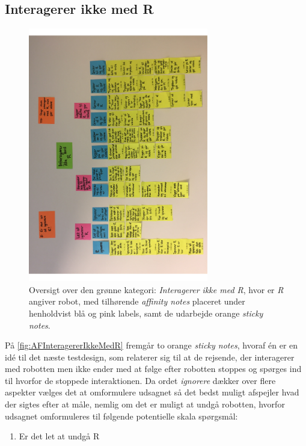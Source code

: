 \subsection{Interagerer ikke med R}
\label{ParametreInteragererIkkeMedR}
%
\begin{figure}[H]
\centering
\includegraphics[width = 0.7\textwidth, angle = -90]{Figure/AffinityDiagram/InteragererIkkeMedR} 
\caption{Oversigt over den grønne kategori: \textit{Interagerer ikke med R}, hvor er \textit{R} angiver robot, med tilhørende \textit{affinity notes} placeret under henholdvist blå og pink labels, samt de udarbejde orange \textit{sticky notes}.}
\label{fig:AFInteragererIkkeMedR}
\end{figure}
\noindent
%
På \autoref{fig:AFInteragererIkkeMedR} fremgår to orange \textit{sticky notes}, hvoraf én er en idé til det næste testdesign, som relaterer sig til at de rejsende, der interagerer med robotten men ikke ender med at følge efter robotten stoppes og spørges ind til hvorfor de stoppede interaktionen. Da ordet \textit{ignorere} dækker over flere aspekter vælges det at omformulere udsagnet så det bedst muligt afspejler hvad der sigtes efter at måle, nemlig om det er muligt at undgå robotten, hvorfor udsagnet omformuleres til følgende potentielle skala spørgsmål:\blankline 
%
\begin{enumerate}
  \item Er det let at undgå R\blankline
\end{enumerate} 
